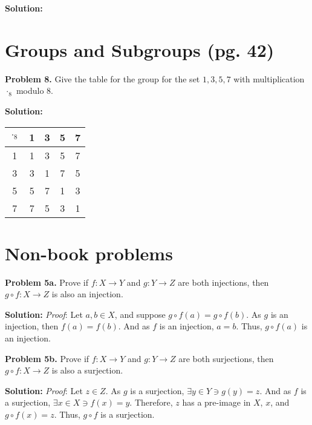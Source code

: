 \documentclass[12pt, letterpaper]{article}
\newenvironment{problem}
    [1]
    {\noindent \textbf{Problem #1.}}
    {\vspace{3mm}}
\newenvironment{solution}
    [0]
    {\noindent \textbf{Solution:}} 
    {\vspace{3mm}}
\begin{document}
    \begin{solution}
    \end{solution}
\section{Groups and Subgroups (pg. 42)}
    \begin{problem}{8}
        Give the table for the group for the set ${1, 3, 5, 7}$ with multiplication
        $\cdot_8$ modulo 8.
    \end{problem}

    \begin{solution}
        \begin{center}
        \begin{tabular}{ c | c c c c } 
            $\cdot_8$ & 1 & 3 & 5 & 7 \\ 
            \hline
            1 & 1 & 3 & 5 & 7 \\ 
            3 & 3 & 1 & 7 & 5 \\ 
            5 & 5 & 7 & 1 & 3 \\ 
            7 & 7 & 5 & 3 & 1 \\
        \end{tabular}
        \end{center}
    \end{solution}
\section{Non-book problems}
    \begin{problem}{5a}
        Prove if $f:X \rightarrow Y$ and $g: Y \rightarrow Z$ are both injections,
        then $g \circ f: X \rightarrow Z$ is also an injection.
    \end{problem}

    \begin{solution}
        \emph{Proof}: Let $a, b \in X$, and suppose $g \circ f(a) = g \circ f(b)$. As $g$
        is an injection, then $f(a) = f(b)$. And as $f$ is an injection, $a = b$. Thus,
        $g \circ f(a)$ is an injection.
    \end{solution}

    \begin{problem}{5b}
        Prove if $f:X \rightarrow Y$ and $g: Y \rightarrow Z$ are both surjections,
        then $g \circ f: X \rightarrow Z$ is also a surjection.
    \end{problem}

    \begin{solution}
        \emph{Proof}: Let $z \in Z$. As $g$ is a surjection, $\exists y \in Y \ni g(y)=z$.
        And as $f$ is a surjection, $\exists x \in X \ni f(x)=y$. Therefore, $z$ has a 
        pre-image in $X$, $x$, and $g \circ f(x)=z$. Thus, $g \circ f$ is a surjection.
    \end{solution}
\end{document}
